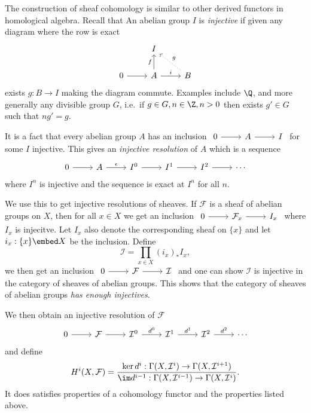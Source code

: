 \documentclass[a4paper]{article}
\newcommand{\sh}[1]{\mathcal{#1}} %
\begin{document}
The construction of sheaf cohomology is similar to other derived functors in homological algebra. Recall that An abelian group \(I\) is \emph{injective} if given any diagram where the row is exact
\[
  \begin{tikzcd}
    & I \\
    0 \ar[r] & A \ar[r, "i"] \ar[u, "f"] & B \ar[ul, dotted, "g"']
  \end{tikzcd}
\]
exists \(g: B \to I\) making the diagram commute. Examples include \(\Q\), and more generally any divisible group \(G\), i.e.\ if \(g \in G, n \in \Z, n > 0\) then exists \(g' \in G\) such that \(ng' = g\).

It is a fact that every abelian group \(A\) has an inclusion \(
\begin{tikzcd}
  0 \ar[r] & A \ar[r] & I
\end{tikzcd}
\) for some \(I\) injective. This gives an \emph{injective resolution} of \(A\) which is a sequence
\[
  \begin{tikzcd}
    0 \ar[r] & A \ar[r, "\epsilon"] & I^0 \ar[r] & I^1 \ar[r] & I^2 \ar[r] & \cdots
  \end{tikzcd}
\]
where \(I^n\) is injective and the sequence is exact at \(I^n\) for all \(n\).

We use this to get injective resolutions of sheaves. If \(\sh F\) is a sheaf of abelian groups on \(X\), then for all \(x \in X\) we get an inclusion \(
\begin{tikzcd}
  0 \ar[r] & \sh F_x \ar[r] & I_x
\end{tikzcd}
\) where \(I_x\) is injecitve. Let \(I_x\) also denote the corresponding sheaf on \(\{x\}\) and let \(i_x: \{x\} \embed X\) be the inclusion. Define
\[
  \sh I = \prod_{x \in X} (i_x)_* I_x,
\]
we then get an inclusion \(
\begin{tikzcd}
  0 \ar[r] & \sh F \ar[r] & \sh I
\end{tikzcd}
\) and one can show \(\sh I\) is injective in the category of sheaves of abelian groups. This shows that the category of sheaves of abelian groups \emph{has enough injectives}.

We then obtain an injective resolution of \(\sh F\)
\[
  \begin{tikzcd}
    0 \ar[r] & \sh F \ar[r] & \sh I^0 \ar[r, "d^0"] & \sh I^1 \ar[r, "d^1"] & \sh I^2 \ar[r, "d^2"] & \cdots
  \end{tikzcd}
\]
and define
\[
  H^i(X, \sh F) = \frac{\ker d^i: \Gamma(X, \sh I^i) \to \Gamma(X, \sh I^{i + 1})}{\im d^{i - 1}: \Gamma(X, \sh I^{i - 1}) \to \Gamma(X, \sh I^i)}.
\]
It does satisfies properties of a cohomology functor and the properties listed above.
\end{document}

